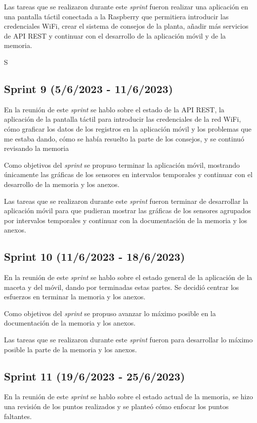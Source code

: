 Las tareas que se realizaron durante este \textit{sprint} fueron realizar una aplicación en una pantalla táctil conectada a la Raspberry que permitiera introducir las credenciales WiFi, crear el sistema de consejos de la planta, añadir más servicios de API REST y continuar con el desarrollo de la aplicación móvil y de la memoria.


S\subsection{Sprint 9 (5/6/2023 - 11/6/2023)}
En la reunión de este \textit{sprint} se hablo sobre el estado de la API REST, la aplicación de la pantalla táctil para introducir las credenciales de la red WiFi, cómo graficar los datos de los registros en la aplicación móvil y los problemas que me estaba dando, cómo se había resuelto la parte de los consejos, y se continuó revisando la memoria

Como objetivos del \textit{sprint} se propuso terminar la aplicación móvil, mostrando únicamente las gráficas de los sensores en intervalos temporales y continuar con el desarrollo de la memoria y los anexos.

Las tareas que se realizaron durante este \textit{sprint} fueron terminar de desarrollar la aplicación móvil para que pudieran mostrar las gráficas de los sensores agrupados por intervalos temporales y continuar con la documentación de la memoria y los anexos.


\subsection{Sprint 10 (11/6/2023 - 18/6/2023)}
En la reunión de este \textit{sprint} se hablo sobre el estado general de la aplicación de la maceta y del móvil, dando por terminadas estas partes. Se decidió centrar los esfuerzos en terminar la memoria y los anexos.

Como objetivos del \textit{sprint} se propuso avanzar lo máximo posible en la documentación de la memoria y los anexos.

Las tareas que se realizaron durante este \textit{sprint} fueron para desarrollar lo máximo posible la parte de la memoria y los anexos.


\subsection{Sprint 11 (19/6/2023 - 25/6/2023)}
En la reunión de este \textit{sprint} se hablo sobre el estado actual de la memoria, se hizo una revisión de los puntos realizados y se planteó cómo enfocar los puntos faltantes.

